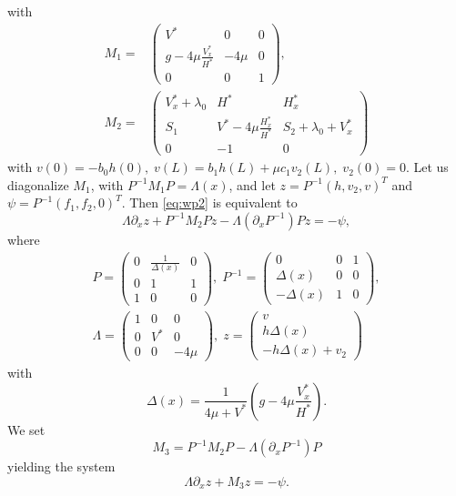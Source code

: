 \documentclass[11pt]{article}
\begin{document}
with
\begin{equation}
\begin{split}
M_{1}=& \begin{pmatrix}
V^{*} & 0 & 0\\
g-4\mu\frac{V_{x}^{*}}{H^{*}} & -4\mu & 0\\
0& 0 & 1
    \end{pmatrix},\\
    M_{2} =&\begin{pmatrix}
    V_{x}^{*}+\lambda_{0} & H^{*} & H_{x}^{*}\\
    S_{1} & V^{*}-4\mu \frac{H_{x}^{*}}{H^{*}} & S_{2}+\lambda_{0}+V_{x}^{*}\\
    0 & -1 & 0
    \end{pmatrix}
    \end{split}
\end{equation}
with
 $v(0) = -b_{0}h(0),\;v(L) = b_{1}h(L)+\mu c_{1}v_{2}(L),\; v_{2}(0) = 0.$
Let us diagonalize $M_{1}$, with $P^{-1}M_{1}P=\Lambda(x)$, and let $z = P^{-1}(h,v_{2},v)^{T}$ and ${\psi} = P^{-1}(f_{1},f_{2},0)^{T}$. Then \eqref{eq:wp2} is equivalent to
\begin{equation}
\Lambda \partial_{x}z + P^{-1}M_{2}P z - \Lambda (\partial_{x}P^{-1})Pz = {-} {\psi},
\end{equation}
where
\begin{equation}
\begin{split}
    P = \begin{pmatrix}
        0 & \frac{1}{\Delta(x)} & 0 \\ 0 & 1 & 1 \\ 1 & 0 & 0
    \end{pmatrix}, \;
    P^{-1} = \begin{pmatrix}
        0 & 0 & 1 \\ \Delta(x) & 0 & 0 \\ -\Delta(x) & {1} & 0
    \end{pmatrix},\\
    \Lambda = \begin{pmatrix}
        1 & 0 & 0 \\ 0 & V^* & 0 \\ 0 & 0 & -4 \mu
    \end{pmatrix}, \;
    z = \begin{pmatrix}
        v \\ h \Delta(x) \\ -h \Delta(x) + v_2
    \end{pmatrix}
    \end{split}
\end{equation}
with \begin{equation}\Delta(x) = \frac{1}{4\mu + V^*}\left( g-4\mu\frac{V_x^*}{H^*} \right).\end{equation}
We set
\begin{equation}
    M_{3} = P^{-1}M_{2}P-\Lambda(\partial_{x}P^{-1})P
\end{equation}
yielding the system
\begin{equation}
    \Lambda \partial_x z + M_3 z = {-} {\psi}.
\end{equation}
\end{document}
